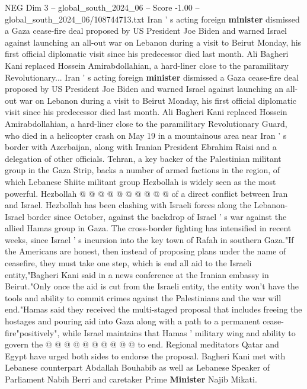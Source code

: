 \begin{textsample}{NEG Dim 3 – global\_south\_2024\_06 – Score -1.00 – global\_south\_2024\_06/108744713.txt}  \label{ex:f3_neg_115}
Iran ' s acting foreign \textbf{minister} dismissed a Gaza cease-fire deal proposed by US President Joe Biden and warned Israel against launching an all-out war on Lebanon during a visit to Beirut Monday, his first official diplomatic visit since his predecessor died last month.
Ali Bagheri Kani replaced Hossein Amirabdollahian, a hard-liner close to the paramilitary Revolutionary...
Iran ' s acting foreign \textbf{minister} dismissed a Gaza cease-fire deal proposed by US President Joe Biden and warned Israel against launching an all-out war on Lebanon during a visit to Beirut Monday, his first official diplomatic visit since his predecessor died last month.
Ali Bagheri Kani replaced Hossein Amirabdollahian, a hard-liner close to the paramilitary Revolutionary Guard, who died in a helicopter crash on May 19 in a mountainous area near Iran ' s border with Azerbaijan, along with Iranian President Ebrahim Raisi and a delegation of other officials.
Tehran, a key backer of the Palestinian militant group in the Gaza Strip, backs a number of armed factions in the region, of which Lebanese Shiite militant group Hezbollah is widely seen as the most powerful.
Hezbollah @ @ @ @ @ @ @ @ @ @ of a direct conflict between Iran and Israel.
Hezbollah has been clashing with Israeli forces along the Lebanon-Israel border since October, against the backdrop of Israel ' s war against the allied Hamas group in Gaza.
The cross-border fighting has intensified in recent weeks, since Israel ' s incursion into the key town of Rafah in southern Gaza."If the Americans are honest, then instead of proposing plans under the name of ceasefire, they must take one step, which is end all aid to the Israeli entity,"Bagheri Kani said in a news conference at the Iranian embassy in Beirut."Only once the aid is cut from the Israeli entity, the entity won't have the tools and ability to commit crimes against the Palestinians and the war will end."Hamas said they received the multi-staged proposal that includes freeing the hostages and pouring aid into Gaza along with a path to a permanent cease-fire"positively", while Israel maintains that Hamas ' military wing and ability to govern the @ @ @ @ @ @ @ @ @ @ to end.
Regional meditators Qatar and Egypt have urged both sides to endorse the proposal.
Bagheri Kani met with Lebanese counterpart Abdallah Bouhabib as well as Lebanese Speaker of Parliament Nabih Berri and caretaker Prime \textbf{Minister} Najib Mikati.

\end{textsample}
